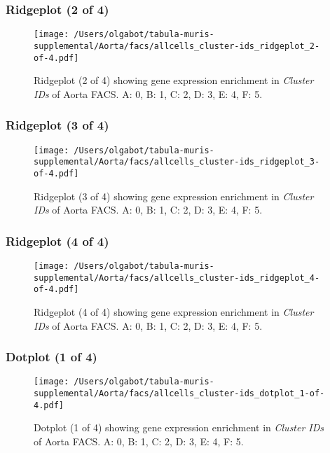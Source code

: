 \clearpage
\subsubsection{Ridgeplot (2 of 4)}
\begin{figure}[h]
\centering
\texttt{[image: /Users/olgabot/tabula-muris-supplemental/Aorta/facs/allcells\_cluster-ids\_ridgeplot\_2-of-4.pdf]}

\caption{ Ridgeplot (2 of 4)  showing gene expression enrichment in \emph{Cluster IDs} of Aorta FACS. A: 0, B: 1, C: 2, D: 3, E: 4, F: 5.}
\end{figure}


\clearpage
\subsubsection{Ridgeplot (3 of 4)}
\begin{figure}[h]
\centering
\texttt{[image: /Users/olgabot/tabula-muris-supplemental/Aorta/facs/allcells\_cluster-ids\_ridgeplot\_3-of-4.pdf]}

\caption{ Ridgeplot (3 of 4)  showing gene expression enrichment in \emph{Cluster IDs} of Aorta FACS. A: 0, B: 1, C: 2, D: 3, E: 4, F: 5.}
\end{figure}


\clearpage
\subsubsection{Ridgeplot (4 of 4)}
\begin{figure}[h]
\centering
\texttt{[image: /Users/olgabot/tabula-muris-supplemental/Aorta/facs/allcells\_cluster-ids\_ridgeplot\_4-of-4.pdf]}

\caption{ Ridgeplot (4 of 4)  showing gene expression enrichment in \emph{Cluster IDs} of Aorta FACS. A: 0, B: 1, C: 2, D: 3, E: 4, F: 5.}
\end{figure}


\clearpage
\subsubsection{Dotplot (1 of 4)}
\begin{figure}[h]
\centering
\texttt{[image: /Users/olgabot/tabula-muris-supplemental/Aorta/facs/allcells\_cluster-ids\_dotplot\_1-of-4.pdf]}

\caption{ Dotplot (1 of 4)  showing gene expression enrichment in \emph{Cluster IDs} of Aorta FACS. A: 0, B: 1, C: 2, D: 3, E: 4, F: 5.}
\end{figure}


